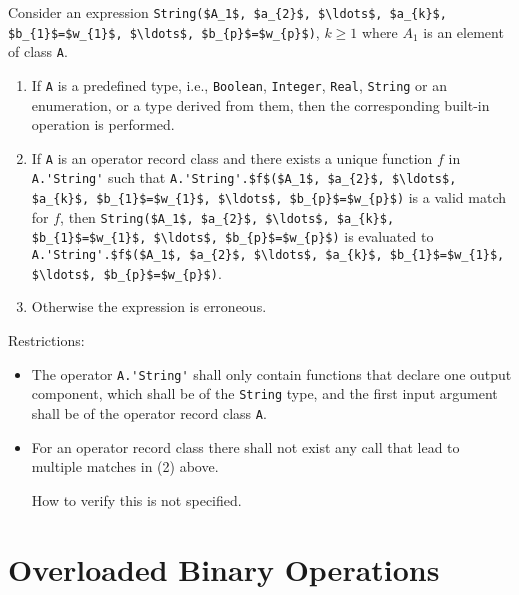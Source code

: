 Consider an expression \lstinline[mathescape=true]!String($A_1$, $a_{2}$, $\ldots$, $a_{k}$, $b_{1}$=$w_{1}$, $\ldots$, $b_{p}$=$w_{p}$)!,
$k \ge 1$ where $A_1$ is an element of class \lstinline!A!.

\begin{enumerate}
\item
  If \lstinline!A! is a predefined type, i.e., \lstinline!Boolean!, \lstinline!Integer!, \lstinline!Real!, \lstinline!String! or
  an enumeration, or a type derived from them, then the corresponding
  built-in operation is performed.
\item
  If \lstinline!A! is an operator record class and there exists a unique function
  $f$ in \lstinline!A.'String'! such that
  \lstinline[mathescape=true]!A.'String'.$f$($A_1$, $a_{2}$, $\ldots$, $a_{k}$, $b_{1}$=$w_{1}$, $\ldots$, $b_{p}$=$w_{p}$)!
  is a valid match for $f$, then
  \lstinline[mathescape=true]!String($A_1$, $a_{2}$, $\ldots$, $a_{k}$, $b_{1}$=$w_{1}$, $\ldots$, $b_{p}$=$w_{p}$)!
  is evaluated to\\
  \lstinline[mathescape=true]!A.'String'.$f$($A_1$, $a_{2}$, $\ldots$, $a_{k}$, $b_{1}$=$w_{1}$, $\ldots$, $b_{p}$=$w_{p}$)!.
\item
  Otherwise the expression is erroneous.
\end{enumerate}

Restrictions:
\begin{itemize}
\item
  The operator \lstinline!A.'String'! shall only contain functions that declare one
  output component, which shall be of the \lstinline!String! type, and the first
  input argument shall be of the operator record class \lstinline!A!.
\item
  For an operator record class there shall not exist any call that lead
  to multiple matches in (2) above.
  \begin{nonnormative}
  How to verify this is not specified.
  \end{nonnormative}
\end{itemize}

\section{Overloaded Binary Operations}

\newcommand{\theop}{X}

